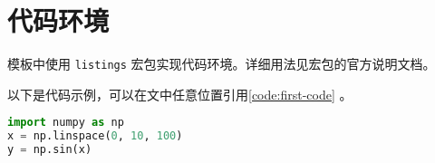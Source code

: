 \chapter{代码环境}
模板中使用 \texttt{listings} 宏包实现代码环境。详细用法见宏包的官方说明文档。

以下是代码示例，可以在文中任意位置引用\autoref{code:first-code} 。
\begin{lstlisting}[language=python, caption=示例代码, label={code:first-code}]
import numpy as np
x = np.linspace(0, 10, 100)
y = np.sin(x)
\end{lstlisting}
